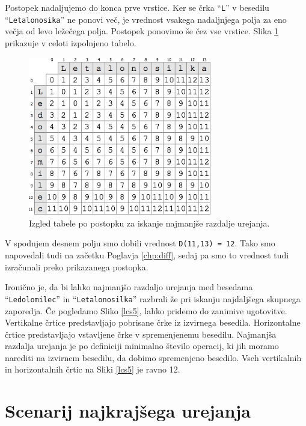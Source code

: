 \documentclass[a4paper, 12pt, twoside]{book}
\begin{document}
Postopek nadaljujemo do konca prve vrstice. Ker se črka “{\tt L}” v besedilu “{\tt Letalonosika}” ne ponovi več, je vrednost vsakega nadaljnjega polja za eno večja od levo ležečega polja. Postopek ponovimo še čez vse vrstice. Slika \ref{med4} prikazuje v celoti izpolnjeno tabelo.

\begin{figure}[placement h]
\begin{center}
\includegraphics[width=8cm]{med4.png}
\end{center}
\caption{Izgled tabele po postopku za iskanje najmanjše razdalje urejanja.}
\label{med4}
\end{figure}

V spodnjem desnem polju smo dobili vrednost {\tt D(11,13) = 12}. Tako smo napovedali tudi na začetku Poglavja \ref{chp:diff}, sedaj pa smo to vrednost tudi izračunali preko prikazanega postopka.

Ironično je, da bi lahko najmanjšo razdaljo urejanja med besedama “{\tt Ledolomilec}” in “{\tt Letalonosilka}” razbrali že pri iskanju najdaljšega skupnega zaporedja. Če pogledamo Sliko \ref{lcs5}, lahko pridemo do zanimive ugotovitve. Vertikalne črtice predstavljajo pobrisane črke iz izvirnega besedila. Horizontalne črtice predstavljajo vstavljene črke v spremenjenemu besedilu. Najmanjša razdalja urejanja je po definiciji minimalno število operacij, ki jih moramo narediti na izvirnem besedilu, da dobimo spremenjeno besedilo. Vseh vertikalnih in horizontalnih črtic na Sliki \ref{lcs5} je ravno 12.

\section{Scenarij najkrajšega urejanja}
\label{sec:ses}
\end{document}
